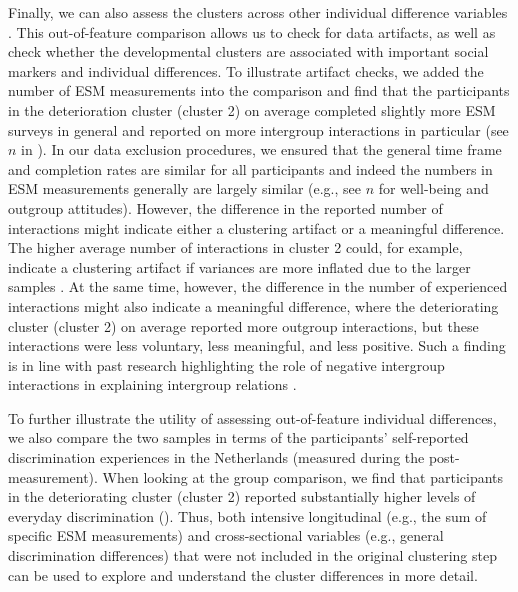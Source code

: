 Finally, we can also assess the clusters across other individual
difference variables \citep[e.g.,][]{monden2022}. This out-of-feature
comparison allows us to check for data artifacts, as well as check
whether the developmental clusters are associated with important social
markers and individual differences. To illustrate artifact checks, we
added the number of ESM measurements into the comparison and find that
the participants in the deterioration cluster (cluster 2) on average
completed slightly more ESM surveys in general and reported on more
intergroup interactions in particular (see \(n\) in
). In our data exclusion procedures, we
ensured that the general time frame and completion rates are similar for
all participants and indeed the numbers in ESM measurements generally
are largely similar (e.g., see \(n\) for well-being and outgroup
attitudes). However, the difference in the reported number of
interactions might indicate either a clustering artifact or a meaningful
difference. The higher average number of interactions in cluster 2
could, for example, indicate a clustering artifact if variances are more
inflated due to the larger samples \citep{kogan2006}. At the same time,
however, the difference in the number of experienced interactions might
also indicate a meaningful difference, where the deteriorating cluster
(cluster 2) on average reported more outgroup interactions, but these
interactions were less voluntary, less meaningful, and less positive.
Such a finding is in line with past research highlighting the role of
negative intergroup interactions in explaining intergroup relations
\citep[e.g.,][]{Barlow2012, Prati2021, Graf2014}.

To further illustrate the utility of assessing out-of-feature individual
differences, we also compare the two samples in terms of the
participants' self-reported discrimination experiences in the
Netherlands (measured during the post-measurement). When looking at the
group comparison, we find that participants in the deteriorating cluster
(cluster 2) reported substantially higher levels of everyday
discrimination (). Thus, both intensive
longitudinal (e.g., the sum of specific ESM measurements) and
cross-sectional variables (e.g., general discrimination differences)
that were not included in the original clustering step can be used to
explore and understand the cluster differences in more detail.


